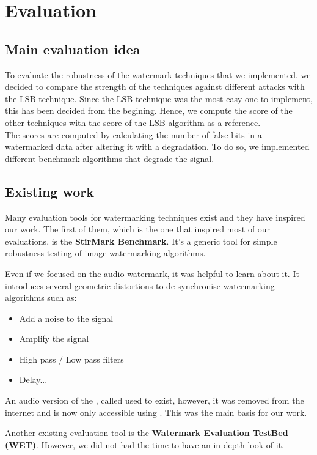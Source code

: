 \chapter{Evaluation}
\section{Main evaluation idea}
To evaluate the robustness of the watermark techniques that we implemented, we decided to compare the strength of the techniques against different attacks with the \ac{LSB} technique. Since the \ac{LSB} technique was the most easy one to implement, this has been decided from the begining. Hence, we compute the score of the other techniques with the score of the \ac{LSB} algorithm as a reference. \\

The scores are computed by calculating the number of false bits in a watermarked data after altering it with a degradation. To do so, we implemented different benchmark algorithms that degrade the signal. \\
\section{Existing work}
Many evaluation tools for watermarking techniques exist and they have inspired our work. 
The first of them, which is the one that inspired most of our evaluations, is the \textbf{StirMark Benchmark}\cite{steinbach2001stirmark}. It's a generic tool for simple robustness testing of image watermarking algorithms. 

Even if we focused on the audio watermark, it was helpful to learn about it. It introduces several geometric distortions to de-synchronise watermarking algorithms such as:
\begin{itemize}
 \item Add a noise to the signal
 \item Amplify  the signal
 \item High pass / Low pass filters
 \item Delay...
\end{itemize}

An audio version of the , called  used to exist, however, it was removed from the internet and is now only accessible using . This was the main basis for our work.

Another existing evaluation tool is the \textbf{Watermark Evaluation TestBed (WET)}. However, we did not had the time to have an in-depth look of it.

